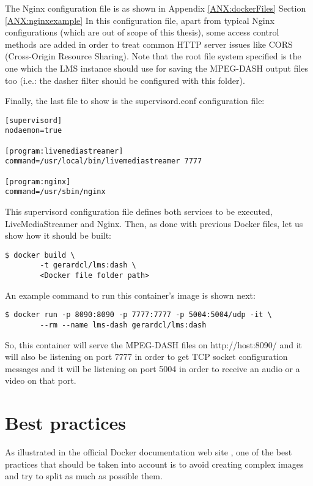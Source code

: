 The Nginx configuration file is as shown in Appendix \ref{ANX:dockerFiles} Section \ref{ANX:nginxexample} In this configuration file, apart from typical Nginx configurations (which are out of scope of this thesis), some access control methods are added in order to treat common HTTP server issues like CORS (Cross-Origin Resource Sharing). Note that the root file system specified is the one which the LMS instance should use for saving the MPEG-DASH output files too (i.e.: the dasher filter should be configured with this folder).

Finally, the last file to show is the supervisord.conf configuration file:

\begin{verbatim}
[supervisord]
nodaemon=true

[program:livemediastreamer]
command=/usr/local/bin/livemediastreamer 7777

[program:nginx]
command=/usr/sbin/nginx 
\end{verbatim}

This supervisord configuration file defines both services to be executed, LiveMediaStreamer and Nginx. Then, as done with previous Docker files, let us show how it should be built:

\begin{verbatim}
$ docker build \
		-t gerardcl/lms:dash \
		<Docker file folder path>
\end{verbatim}

An example command to run this container's image is shown next:

\begin{verbatim}
$ docker run -p 8090:8090 -p 7777:7777 -p 5004:5004/udp -it \
		--rm --name lms-dash gerardcl/lms:dash 
\end{verbatim}

So, this container will serve the MPEG-DASH files on http://host:8090/ and it will also be listening on port 7777 in order to get TCP socket configuration messages and it will be listening on port 5004 in order to receive an audio or a video on that port.

\section{Best practices}

As illustrated in the official Docker documentation web site \cite{dockerBP}, one of the best practices that should be taken into account is to avoid creating complex images and try to split as much as possible them.

